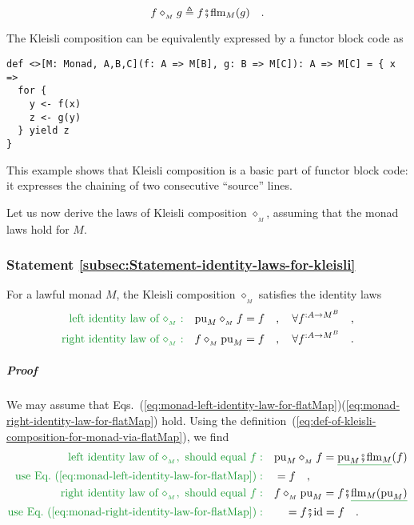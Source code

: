 ~\vspace{-0.8\baselineskip}
\begin{equation}
f\diamond_{_{M}}g\triangleq f\bef\text{flm}_{M}(g)\quad.\label{eq:def-of-kleisli-composition-for-monad-via-flatMap}
\end{equation}
\vspace{-0.5\baselineskip}

The Kleisli composition can be equivalently expressed by a functor
block code as

\begin{lstlisting}[mathescape=true]
def <>[M: Monad, A,B,C](f: A => M[B], g: B => M[C]): A => M[C] = { x =>
  for {
    y <- f(x)
    z <- g(y)
  } yield z
}
\end{lstlisting}

This example shows that Kleisli composition is a basic part of functor
block code: it expresses the chaining of two consecutive \textsf{``}source\textsf{''}
lines.

Let us now derive the laws of Kleisli composition $\diamond_{_{M}}$,
assuming that the monad laws hold for $M$. 

\subsubsection{Statement \label{subsec:Statement-identity-laws-for-kleisli}\ref{subsec:Statement-identity-laws-for-kleisli}}

For a lawful monad $M$, the Kleisli composition $\diamond_{_{M}}$
satisfies the identity laws
\begin{align}
{\color{greenunder}\text{left identity law of }\diamond_{_{M}}:}\quad & \text{pu}_{M}\diamond_{_{M}}f=f\quad,\quad\forall f^{:A\rightarrow M^{B}}\quad,\label{eq:kleisli-left-identity-law}\\
{\color{greenunder}\text{right identity law of }\diamond_{_{M}}:}\quad & f\diamond_{_{M}}\text{pu}_{M}=f\quad,\quad\forall f^{:A\rightarrow M^{B}}\quad.\label{eq:kleisli-right-identity-law}
\end{align}


\subparagraph{Proof}

We may assume that Eqs.~(\ref{eq:monad-left-identity-law-for-flatMap})\textendash (\ref{eq:monad-right-identity-law-for-flatMap})
hold. Using the definition~(\ref{eq:def-of-kleisli-composition-for-monad-via-flatMap}),
we find
\begin{align*}
{\color{greenunder}\text{left identity law of }\diamond_{_{M}},\text{ should equal }f:}\quad & \text{pu}_{M}\diamond_{_{M}}f=\gunderline{\text{pu}_{M}\bef\text{flm}_{M}}(f)\\
{\color{greenunder}\text{use Eq.~(\ref{eq:monad-left-identity-law-for-flatMap})}:}\quad & =f\quad,\\
{\color{greenunder}\text{right identity law of }\diamond_{_{M}},\text{ should equal }f:}\quad & f\diamond_{_{M}}\text{pu}_{M}=f\bef\gunderline{\text{flm}_{M}(\text{pu}_{M})}\\
{\color{greenunder}\text{use Eq.~(\ref{eq:monad-right-identity-law-for-flatMap})}:}\quad & \quad=f\bef\text{id}=f\quad.
\end{align*}

